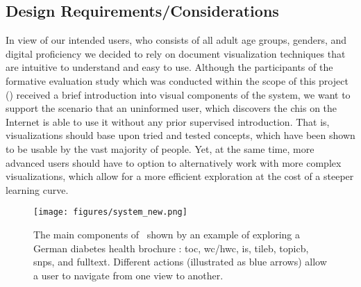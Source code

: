 \subsection{Design Requirements/Considerations}\label{sec:design-requirements}
In view of our intended users, who consists of all adult age groups, genders, and digital proficiency we decided to rely on document visualization techniques that are intuitive to understand and easy to use. 
%
Although the participants of the formative evaluation study which was conducted within the scope of this project () received a brief introduction into visual components of the system, we want to support the scenario that an uninformed user, which discovers the \acrshort{chis} on the Internet is able to use it without any prior supervised introduction. 
%
That is, visualizations should base upon tried and tested concepts, which have been shown to be usable by the vast majority of people. 
%
Yet, at the same time, more advanced users should have to option to alternatively work with more complex visualizations, which allow for a more efficient exploration at the cost of a steeper learning curve. 


\begin{figure*}[ht!]
    \centering
    \texttt{[image: figures/system\_new.png]}
    \caption{
    The main components of \apluschis\ shown by an example of exploring a German diabetes health brochure \cite{aok}:
    \acrfull{toc}, \acrfull{wc}/\acrfull{hwc}, \acrfull{is}, \acrfull{tileb}, \acrfull{topicb}, \acrfull{snps}, and \acrfull{fulltext}.
    Different actions (illustrated as blue arrows) allow a user to navigate from one view to another.}    
    \label{fig:exploration-mockup}
\end{figure*}

